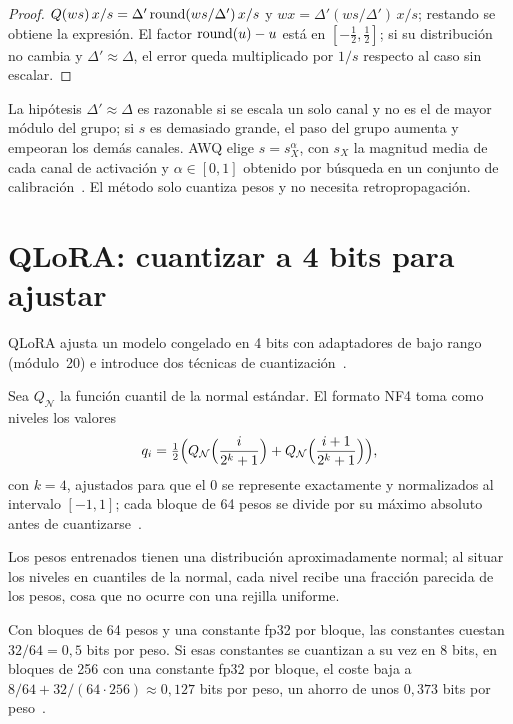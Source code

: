 \begin{proof}
$Q(ws)\,x/s=\Delta'\operatorname{round}(ws/\Delta')\,x/s$ y $wx=\Delta'(ws/\Delta')\,x/s$; restando se obtiene la expresión. El factor $\operatorname{round}(u)-u$ está en $[-\frac12,\frac12]$; si su distribución no cambia y $\Delta'\approx\Delta$, el error queda multiplicado por $1/s$ respecto al caso sin escalar.
\end{proof}

La hipótesis $\Delta'\approx\Delta$ es razonable si se escala un solo canal y no es el de mayor módulo del grupo; si $s$ es demasiado grande, el paso del grupo aumenta y empeoran los demás canales. AWQ elige $s=s_X^{\alpha}$, con $s_X$ la magnitud media de cada canal de activación y $\alpha\in[0,1]$ obtenido por búsqueda en un conjunto de calibración~\cite[§3.2, ec.~5]{awq}. El método solo cuantiza pesos y no necesita retropropagación.

\section{QLoRA: cuantizar a 4 bits para ajustar}

QLoRA ajusta un modelo congelado en 4 bits con adaptadores de bajo rango (módulo~20) e introduce dos técnicas de cuantización~\cite[§3]{qlora}.

\begin{definicion}\label{def:nf4}
Sea $Q_{\mathcal{N}}$ la función cuantil de la normal estándar. El formato NF4 toma como niveles los valores
\[
q_i=\tfrac12\Bigl(Q_{\mathcal{N}}\Bigl(\frac{i}{2^{k}+1}\Bigr)+Q_{\mathcal{N}}\Bigl(\frac{i+1}{2^{k}+1}\Bigr)\Bigr),
\]
con $k=4$, ajustados para que el $0$ se represente exactamente y normalizados al intervalo $[-1,1]$; cada bloque de 64 pesos se divide por su máximo absoluto antes de cuantizarse~\cite[§3, ec.~4]{qlora}.
\end{definicion}

Los pesos entrenados tienen una distribución aproximadamente normal; al situar los niveles en cuantiles de la normal, cada nivel recibe una fracción parecida de los pesos, cosa que no ocurre con una rejilla uniforme.

\begin{proposicion}\label{prop:doble}
Con bloques de 64 pesos y una constante fp32 por bloque, las constantes cuestan $32/64=0{,}5$ bits por peso. Si esas constantes se cuantizan a su vez en 8 bits, en bloques de 256 con una constante fp32 por bloque, el coste baja a $8/64+32/(64\cdot 256)\approx 0{,}127$ bits por peso, un ahorro de unos $0{,}373$ bits por peso~\cite[§3]{qlora}.
\end{proposicion}

